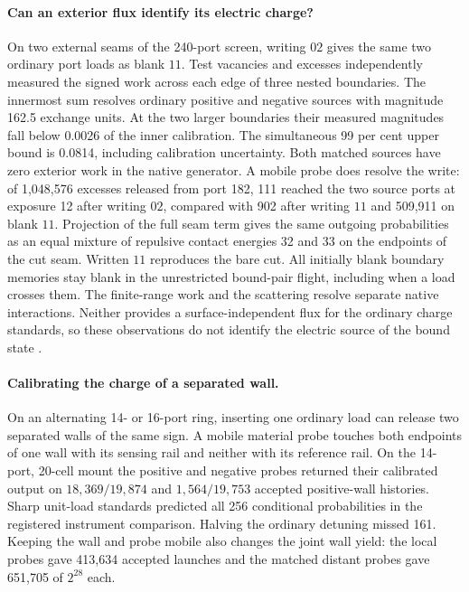\paragraph{Can an exterior flux identify its electric charge?}
On two external seams of the 240-port screen, writing $02$ gives the
same two ordinary port loads as blank $11$. Test vacancies and excesses
independently measured the signed work across each edge of three nested
boundaries. The innermost sum resolves ordinary positive and negative
sources with magnitude 162.5 exchange units. At the two larger boundaries
their measured magnitudes fall below 0.0026 of the inner calibration.
The simultaneous 99 per cent upper bound is 0.0814, including calibration
uncertainty. Both matched sources have zero exterior work in the native
generator. A mobile probe does resolve the write: of 1,048,576 excesses
released from port 182, 111 reached the two source ports at exposure 12
after writing $02$, compared with 902 after writing $11$ and 509,911 on
blank $11$. Projection of the full seam term gives the same outgoing
probabilities as an equal mixture of repulsive contact energies 32 and
33 on the endpoints of the cut seam. Written $11$ reproduces the bare cut.
All initially blank boundary memories stay blank in the unrestricted
bound-pair flight, including when a load crosses them. The finite-range
work and the scattering resolve separate native interactions. Neither
provides a surface-independent flux for the ordinary charge standards,
so these observations do not identify the electric source of the bound
state \cite{ophmodel}.

\paragraph{Calibrating the charge of a separated wall.}
On an alternating 14- or 16-port ring, inserting one ordinary load
can release two separated walls of the same sign. A mobile material
probe touches both endpoints of one wall with its sensing rail and
neither with its reference rail. On the 14-port, 20-cell mount the
positive and negative probes returned their calibrated output on
$18{,}369/19{,}874$ and $1{,}564/19{,}753$ accepted positive-wall
histories. Sharp unit-load standards predicted all 256 conditional
probabilities in the registered instrument comparison. Halving the
ordinary detuning missed 161. Keeping the wall and probe mobile
also changes the joint wall yield: the local probes gave
413,634 accepted launches and the matched distant probes gave
651,705 of $2^{28}$ each.

